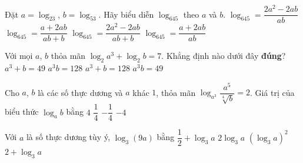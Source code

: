 \begin{ex}%
	[Đề Minh Họa 2017] Đặt $a=\log_23$, $b=\log_53$. Hãy biểu diễn $\log_645$ theo $a$ và  $b$.
	\choice 
		{$\log_645=\dfrac{2a^2-2ab}{ab}$} 
		{\True $\log_645=\dfrac{a+2ab}{ab+b}$} 
		 {$\log_645=\dfrac{2a^2-2ab}{ab+b}$}
		{$\log_645=\dfrac{a+2ab}{ab}$} 
\end{ex}

\begin{ex}%
	[MĐ 103 2020-2021 - ĐỢT 1] Với mọi $a$, $b$ thỏa mãn $\log_2a^3+\log_2b=7$. Khẳng định nào dưới đây  \textbf{đúng}?
	 \choice
		{$a^3+b=49$} 
		 {\True $a^3b=128$}
		 {$a^3+b=128$}
		 {$a^3b=49$}
\end{ex}

\begin{ex}%
	Cho $a$, $b$ là các số thực dương và $a$ khác $1$, thỏa mãn $\log_{a^3}\dfrac{a^5}{\sqrt[4]{b}}=2$. Giá trị của  biểu thức $\log_ab$ bằng
	\choice 
		 {$4$}
		{$\dfrac{1}{4}$} 
		 {$-\dfrac{1}{4}$}
		 {\True $-4$}
\end{ex}

\begin{ex}%
	[TK 2020-2021] Với $a$ là số thực dương tùy ý, $\log_3(9a)$ bằng 
	\choice 
		{$\dfrac{1}{2}+\log_3a$} 
		{$2\log_3a$} 
		{$(\log_3a)^2$} 
		 {\True $2+\log_3a$}
\end{ex}

